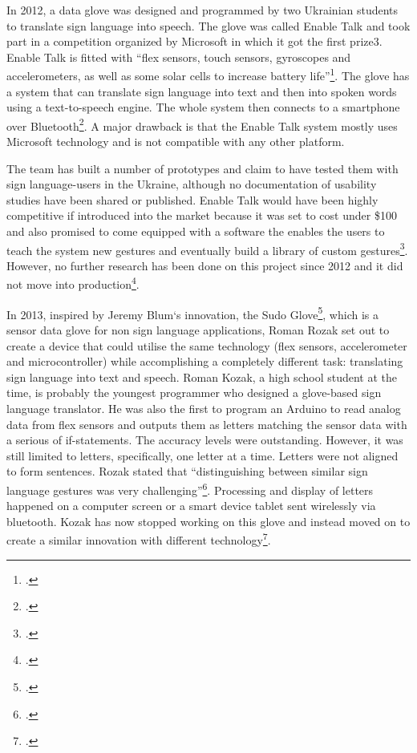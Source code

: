In 2012, a data glove was designed and programmed by two Ukrainian students to translate sign language into speech. The glove was called Enable Talk and took part in a competition organized by Microsoft in which it got the first prize3. Enable Talk is fitted with ``flex sensors, touch sensors, gyroscopes and accelerometers, as well as some solar cells to increase battery life''\footcite{EnableTalk}. The glove has a system that can translate sign language into text and then into spoken words using a text-to-speech engine. The whole system then connects to a smartphone over Bluetooth\texttrademark\footcite{EnableTalk}. A major drawback is that the Enable Talk system mostly uses Microsoft technology and is not compatible with any other platform.

The team has built a number of prototypes and claim to have tested them with sign language-users in the Ukraine, although no documentation of usability studies have been shared or published. Enable Talk would have been highly competitive if introduced into the market because it was set to cost under \$100 and also promised to come equipped with a software the enables the users to teach the system new gestures and eventually build a library of custom gestures\footcite{EnableTalk}. However, no further research has been done on this project since 2012 and it did not move into production\footcite{EnableTalk}. 

In 2013, inspired by Jeremy Blum‘s innovation, the Sudo Glove\footcite{Blum2012}, which is a sensor data glove for non sign language applications, Roman Rozak set out to create a device that could utilise the same technology (flex sensors, accelerometer and microcontroller) while accomplishing a completely different task: translating sign language into text and speech. Roman Kozak, a high school student at the time, is probably the youngest programmer who designed a glove-based sign language translator. He was also the first to program an Arduino to read analog data from flex sensors and outputs them as letters matching the sensor data with a serious of if-statements. The accuracy levels were outstanding. However, it was still limited to letters, specifically, one letter at a time. Letters were not aligned to form sentences. Rozak stated that ``distinguishing between similar sign language gestures was very challenging''\footcite{Rozak}. Processing and display of letters happened on a computer screen or a smart device tablet sent wirelessly via bluetooth. Kozak has now stopped working on this glove and instead moved on to create a similar innovation with different technology\footcite{Rozak}.

